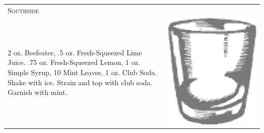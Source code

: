 \documentclass{article}
\begin{document}
\begin{tabular}{p{2in} p{0.5in}}
  \multicolumn{2}{p{3in}}{\centering\Huge\textsc{Southside}} \\ 
   \vspace{-0.1in}2 oz. Beefeater, .5 oz. Fresh-Squeezed Lime Juice. .75 oz. Fresh-Squeezed Lemon, 1 oz. Simple Syrup, 10 Mint Leaves, 1 oz. Club Soda. Shake with ice. Strain and top with club soda. Garnish with mint. &
   \vspace{-0.1in} \includegraphics{rocks_glass.png}
\end{tabular}
\end{document}
